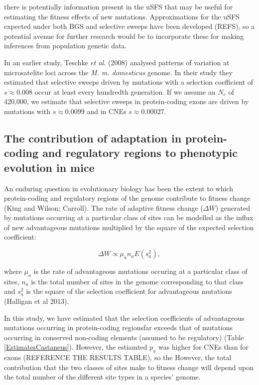 \documentclass[11pt]{article}
\begin{document}
there is potentially information present in the uSFS that may be useful for estimating the fitness effects of new mutations. Approximations for the uSFS expected under both BGS and selective sweeps have been developed (REFS), so a potential avenue for further research would be to incorporate these for making inferences from population genetic data.

In an earlier study, Teschke \textit{et al.} (2008) analysed patterns of variation at microsatelite loci across the \textit{M. m. domesticus} genome. In their study they estimated that selective sweeps driven by mutations with a selection coefficient of $s \approx 0.008$ occur at least every hundredth generation. If we assume an $N_e$ of 420,000, we estimate that selective sweeps in protein-coding exons are driven by mutations with $s \approx 0.0099$ and in CNEs $s \approx 0.00027$. 


\subsection*{The contribution of adaptation in protein-coding and regulatory regions to phenotypic evolution in mice}

An enduring question in evolutionary biology has been the extent to which protein-coding and regulatory regions of the genome contribute to fitness change (King and Wilson; Carroll). The rate of adaptive fitness change ($\Delta W$) generated by mutations occurring at a particular class of sites can be modelled as the influx of new advantageous mutations multiplied by the square of the expected selection coefficient:

\begin{equation}
\label{eq:fitness}
\Delta W \propto \mu_a n_a E(s_a^2),
\end{equation}

where $\mu_a$ is the rate of advantageous mutations occuring at a particular class of sites, \textit{$n_a$} is the total number of sites in the genome corresponding to that class and \textit{$s_a^2$} is the square of the selection coefficient for advantageous mutations (Halligan et al 2013). 

In this study, we have estimated that the selection coefficients of advantageous mutations occurring in protein-coding regionsfar exceeds that of mutations occurring in conserved non-coding elements (assumed to be regulatory) (Table \ref{EstimatesCastaneus}). However, the estiamted $p_a$ was higher for CNEs than for exons (REFERENCE THE RESULTS TABLE), so the 
However, the total contribution that the two classes of sites make to fitness change will depend upon the total number of the different site types in a species' genome. 
\end{document}
